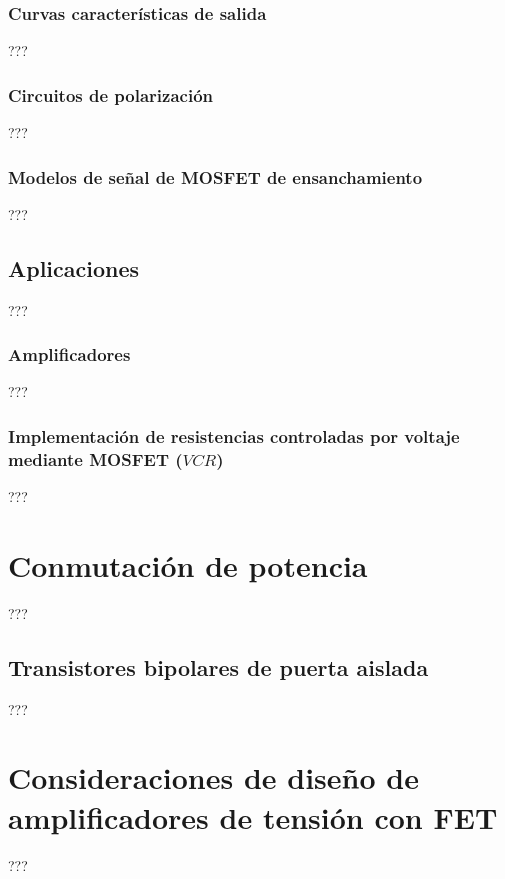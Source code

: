 \subsubsection{Curvas características de salida}
???
\subsubsection{Circuitos de polarización}
???
\subsubsection{Modelos de señal de MOSFET de ensanchamiento}
???
\subsection{Aplicaciones}
???
\subsubsection{Amplificadores}
???
\subsubsection{Implementación de resistencias controladas por voltaje mediante MOSFET ($VCR$)}
???
\section{Conmutación de potencia}
???
\subsection{Transistores bipolares de puerta aislada}
???
\section{Consideraciones de diseño de amplificadores de tensión con FET}
???